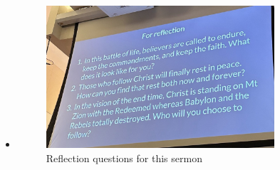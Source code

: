 \begin{itemize}
{\begin{figure}[H]
  \end{figure}}
  \item{\begin{figure}[H]
    \centering
    \includegraphics[width=0.8\textwidth, trim={0cm 0cm 0cm 0cm},clip]{Figures/marchSermon3Reflections.jpg}
    \caption[]{Reflection questions for this sermon}
  \end{figure}}
\end{itemize}